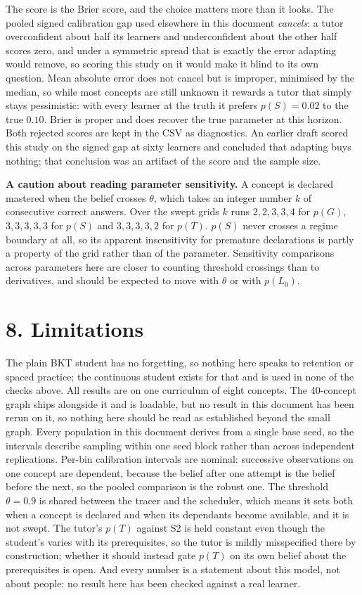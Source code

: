 \documentclass[11pt]{article}
\begin{document}
The score is the Brier score, and the choice matters more than it looks.
The pooled signed calibration gap used elsewhere in this document
\emph{cancels}: a tutor overconfident about half its learners and
underconfident about the other half scores zero, and under a symmetric
spread that is exactly the error adapting would remove, so scoring this
study on it would make it blind to its own question. Mean absolute error
does not cancel but is improper, minimised by the median, so while most
concepts are still unknown it rewards a tutor that simply stays
pessimistic: with every learner at the truth it prefers $p(S)=0.02$ to the
true $0.10$. Brier is proper and does recover the true parameter at this
horizon. Both rejected scores are kept in the CSV as diagnostics. An
earlier draft scored this study on the signed gap at sixty learners and
concluded that adapting buys nothing; that conclusion was an artifact of
the score and the sample size.

\textbf{A caution about reading parameter sensitivity.} A concept is
declared mastered when the belief crosses $\theta$, which takes an integer
number $k$ of consecutive correct answers. Over the swept grids $k$ runs
$2,2,3,3,4$ for $p(G)$, $3,3,3,3,3$ for $p(S)$ and $3,3,3,3,2$ for $p(T)$.
$p(S)$ never crosses a regime boundary at all, so its apparent
insensitivity for premature declarations is partly a property of the grid
rather than of the parameter. Sensitivity comparisons across parameters
here are closer to counting threshold crossings than to derivatives, and
should be expected to move with $\theta$ or with $p(L_0)$.

\section*{8. Limitations}

The plain BKT student has no forgetting, so nothing here speaks to retention or
spaced practice; the continuous student exists for that and is used in none of
the checks above. All results are on one curriculum of eight concepts. The
40-concept graph ships alongside it and is loadable, but no result in this
document has been rerun on it, so nothing here should be read as established
beyond the small graph. Every population in this
document derives from a single base seed, so the intervals describe sampling
within one seed block rather than across independent replications. Per-bin
calibration intervals are nominal: successive observations on one concept are
dependent, because the belief after one attempt is the belief before the next,
so the pooled comparison is the robust one. The threshold $\theta = 0.9$ is
shared between the tracer and the scheduler, which means it sets both when a
concept is declared and when its dependants become available, and it is not
swept. The tutor's $p(T)$ against S2 is held constant even though the student's
varies with its prerequisites, so the tutor is mildly misspecified there by
construction; whether it should instead gate $p(T)$ on its own belief about the
prerequisites is open. And every number is a statement about this model, not
about people: no result here has been checked against a real learner.
\end{document}

